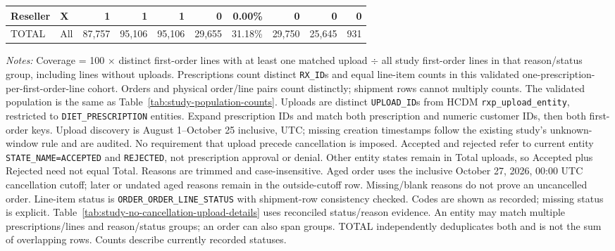 \begin{table}[!htbp]
\begin{tabular}{@{}llrrrrrrrr@{}}
{Reseller} & X & 1 & 1 & 1 & 0 & 0.00\% & 0 & 0 & 0 \\
\midrule
{TOTAL} & All & 87,757 & 95,106 & 95,106 & 29,655 & 31.18\% & 29,750 & 25,645 & 931 \\
\bottomrule
\end{tabular}
\begin{minipage}{\linewidth}
\footnotesize
\textit{Notes:} Coverage = 100 $\times$ distinct first-order lines with at least
one matched upload $\div$ all study first-order lines in that reason/status group, including
lines without uploads. Prescriptions count distinct \texttt{RX\_ID}s and equal
line-item counts in this validated one-prescription-per-first-order-line cohort.
Orders and physical order/line pairs count distinctly;
shipment rows cannot multiply counts. The validated population is the same as
Table~\ref{tab:study-population-counts}.
Uploads are distinct \texttt{UPLOAD\_ID}s from HCDM
\texttt{rxp\_upload\_entity}, restricted to \texttt{DIET\_PRESCRIPTION} entities.
Expand prescription IDs and match both prescription and numeric customer IDs,
then both first-order keys. Upload discovery is August 1--October 25 inclusive,
UTC; missing creation timestamps follow the existing study's unknown-window rule
and are audited. No requirement that upload precede cancellation is imposed.
Accepted and rejected refer to current entity \texttt{STATE\_NAME=ACCEPTED} and
\texttt{REJECTED}, not prescription approval or denial. Other entity states
remain in Total uploads, so Accepted plus Rejected need not equal Total.
Reasons are trimmed and case-insensitive. Aged order uses the inclusive
October 27, 2026, 00:00 UTC cancellation cutoff; later or undated aged reasons
remain in the outside-cutoff row. Missing/blank reasons do not prove an uncancelled
order. Line-item status is \texttt{ORDER\_ORDER\_LINE\_STATUS} with shipment-row consistency checked.
Codes are shown as recorded; missing status is explicit. Table~\ref{tab:study-no-cancellation-upload-details}
uses reconciled status/reason evidence.
An entity may match multiple prescriptions/lines and reason/status groups;
an order can also span groups. TOTAL independently deduplicates both and is not
the sum of overlapping rows. Counts describe currently recorded statuses.
\end{minipage}
\end{table}